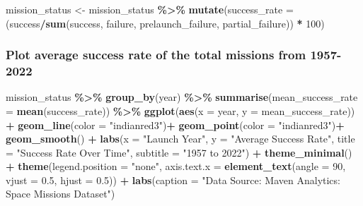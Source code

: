 \documentclass[
]{article}
\newenvironment{Shaded}{\begin{snugshade}}{\end{snugshade}}
\newcommand{\AttributeTok}[1]{\textcolor[rgb]{0.13,0.29,0.53}{#1}}
\newcommand{\DecValTok}[1]{\textcolor[rgb]{0.00,0.00,0.81}{#1}}
\newcommand{\FloatTok}[1]{\textcolor[rgb]{0.00,0.00,0.81}{#1}}
\newcommand{\FunctionTok}[1]{\textcolor[rgb]{0.13,0.29,0.53}{\textbf{#1}}}
\newcommand{\NormalTok}[1]{#1}
\newcommand{\OtherTok}[1]{\textcolor[rgb]{0.56,0.35,0.01}{#1}}
\newcommand{\SpecialCharTok}[1]{\textcolor[rgb]{0.81,0.36,0.00}{\textbf{#1}}}
\newcommand{\StringTok}[1]{\textcolor[rgb]{0.31,0.60,0.02}{#1}}
\begin{document}
\begin{Shaded}
\begin{Highlighting}[]
\NormalTok{mission\_status }\OtherTok{\textless{}{-}}\NormalTok{ mission\_status }\SpecialCharTok{\%\textgreater{}\%}
  \FunctionTok{mutate}\NormalTok{(}\AttributeTok{success\_rate =}\NormalTok{ (success}\SpecialCharTok{/}\FunctionTok{sum}\NormalTok{(success, failure, prelaunch\_failure, partial\_failure)) }\SpecialCharTok{*} \DecValTok{100}\NormalTok{)}
\end{Highlighting}
\end{Shaded}

\hypertarget{plot-average-success-rate-of-the-total-missions-from-1957-2022}{%
\subsubsection{Plot average success rate of the total missions from
1957-2022}\label{plot-average-success-rate-of-the-total-missions-from-1957-2022}}

\begin{Shaded}
\begin{Highlighting}[]
\NormalTok{mission\_status }\SpecialCharTok{\%\textgreater{}\%} 
  \FunctionTok{group\_by}\NormalTok{(year) }\SpecialCharTok{\%\textgreater{}\%} 
  \FunctionTok{summarise}\NormalTok{(}\AttributeTok{mean\_success\_rate =} \FunctionTok{mean}\NormalTok{(success\_rate)) }\SpecialCharTok{\%\textgreater{}\%} 
  \FunctionTok{ggplot}\NormalTok{(}\FunctionTok{aes}\NormalTok{(}\AttributeTok{x =}\NormalTok{ year, }\AttributeTok{y =}\NormalTok{ mean\_success\_rate)) }\SpecialCharTok{+}
  \FunctionTok{geom\_line}\NormalTok{(}\AttributeTok{color =} \StringTok{"indianred3"}\NormalTok{)}\SpecialCharTok{+}
  \FunctionTok{geom\_point}\NormalTok{(}\AttributeTok{color =} \StringTok{"indianred3"}\NormalTok{)}\SpecialCharTok{+}
  \FunctionTok{geom\_smooth}\NormalTok{() }\SpecialCharTok{+}
  \FunctionTok{labs}\NormalTok{(}\AttributeTok{x =} \StringTok{"Launch Year"}\NormalTok{, }
       \AttributeTok{y =} \StringTok{"Average Success Rate"}\NormalTok{, }
       \AttributeTok{title =} \StringTok{"Success Rate Over Time"}\NormalTok{,}
       \AttributeTok{subtitle =} \StringTok{"1957 to 2022"}\NormalTok{) }\SpecialCharTok{+}
  \FunctionTok{theme\_minimal}\NormalTok{() }\SpecialCharTok{+}
  \FunctionTok{theme}\NormalTok{(}\AttributeTok{legend.position =} \StringTok{"none"}\NormalTok{,}
        \AttributeTok{axis.text.x =} \FunctionTok{element\_text}\NormalTok{(}\AttributeTok{angle =} \DecValTok{90}\NormalTok{, }\AttributeTok{vjust =} \FloatTok{0.5}\NormalTok{, }\AttributeTok{hjust =} \FloatTok{0.5}\NormalTok{)) }\SpecialCharTok{+}
  \FunctionTok{labs}\NormalTok{(}\AttributeTok{caption =} \StringTok{"Data Source: Maven Analytics: Space Missions Dataset"}\NormalTok{)}
\end{Highlighting}
\end{Shaded}
\end{document}
